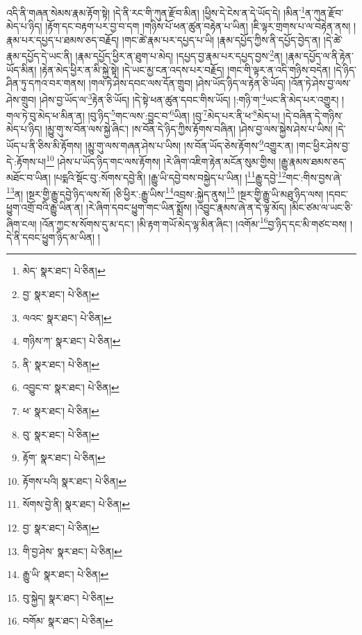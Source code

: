 འདི་ནི་གཞན་སེམས་རྣམ་རྟོག་སྟེ། །དེ་ནི་རང་གི་ཀུན་རྫོབ་མིན། །ཕྱིས་དེ་ངེས་ན་དེ་ཡོད་དེ། །མིན་\footnote{མེད་  སྣར་ཐང་།  པེ་ཅིན། }ན་ཀུན་རྫོབ་མེད་པ་ཉིད། །རྟོག་དང་བརྟག་པར་བྱ་བ་དག །གཉིས་པོ་ཕན་ཚུན་བརྟེན་པ་ཡིན། །ཇི་ལྟར་གྲགས་པ་ལ་བརྟེན་ནས། །རྣམ་པར་དཔྱད་པ་ཐམས་ཅད་བརྗོད། །གང་ཚེ་རྣམ་པར་དཔྱད་པ་ཡི། །རྣམ་དཔྱོད་ཀྱིས་ནི་དཔྱོད་བྱེད་ན། །དེ་ཚེ་རྣམ་དཔྱོད་དེ་ཡང་ནི། །རྣམ་དཔྱོད་ཕྱིར་ན་ཐུག་པ་མེད། །དཔྱད་བྱ་རྣམ་པར་དཔྱད་བྱས་\footnote{བྱ་  སྣར་ཐང་།  པེ་ཅིན། }ན། །རྣམ་དཔྱོད་ལ་ནི་རྟེན་ཡོད་མིན། །རྟེན་མེད་ཕྱིར་ན་མི་སྐྱེ་སྟེ། །དེ་ཡང་མྱ་ངན་འདས་པར་བརྗོད། །གང་གི་ལྟར་ན་འདི་གཉིས་བདེན། །དེ་ཉིད་ཤིན་ཏུ་དཀའ་བར་གནས། །གལ་ཏེ་ཤེས་དབང་ལས་དོན་གྲུབ། །ཤེས་ཡོད་ཉིད་ལ་རྟེན་ཅི་ཡོད། །འོན་ཏེ་ཤེས་བྱ་ལས་ཤེས་གྲུབ། །ཤེས་བྱ་ཡོད་ལ་\footnote{ལའང་  སྣར་ཐང་།  པེ་ཅིན། }རྟེན་ཅི་ཡོད། །དེ་སྟེ་ཕན་ཚུན་དབང་གིས་ཡོད། །:གཉི་ག་\footnote{གཉིས་ཀ་  སྣར་ཐང་།  པེ་ཅིན། }ཡང་ནི་མེད་པར་འགྱུར། །གལ་ཏེ་བུ་མེད་ཕ་མིན་ན། །བུ་ཉིད་\footnote{ནི་  སྣར་ཐང་།  པེ་ཅིན། }གང་ལས་:བྱུང་བ་\footnote{འབྱུང་བ་  སྣར་ཐང་།  པེ་ཅིན། }ཡིན། །བུ་\footnote{ཕ་  སྣར་ཐང་།  པེ་ཅིན། }མེད་པར་ནི་ཕ་\footnote{བུ་  སྣར་ཐང་།  པེ་ཅིན། }མེད་པ། །དེ་བཞིན་དེ་གཉིས་མེད་པ་ཉིད། །མྱུ་གུ་ས་བོན་ལས་སྐྱེ་ཞིང་། །ས་བོན་དེ་ཉིད་ཀྱིས་རྟོགས་བཞིན། །ཤེས་བྱ་ལས་སྐྱེས་ཤེས་པ་ཡིས། །དེ་ཡོད་པ་ནི་ཅིས་མི་རྟོགས། །མྱུ་གུ་ལས་གཞན་ཤེས་པ་ཡིས། །ས་བོན་ཡོད་ཅེས་རྟོགས་\footnote{རྟོག་  སྣར་ཐང་།  པེ་ཅིན། }འགྱུར་ན། །གང་ཕྱིར་ཤེས་བྱ་དེ་:རྟོགས་པ།\footnote{རྟོགས་པའི།  སྣར་ཐང་།  པེ་ཅིན། } །ཤེས་པ་ཡོད་ཉིད་གང་ལས་རྟོགས། །རེ་ཞིག་འཇིག་རྟེན་མངོན་སུམ་གྱིས། །རྒྱུ་རྣམས་ཐམས་ཅད་མཐོང་བ་ཡིན། །པདྨའི་སྡོང་བུ་:སོགས་དབྱེ་ནི། །རྒྱུ་ཡི་དབྱེ་བས་བསྐྱེད་པ་ཡིན། །\footnote{སོགས་བྱེ་ནི།   སྣར་ཐང་།  པེ་ཅིན། }རྒྱུ་དབྱེ་\footnote{བྱ་  སྣར་ཐང་།  པེ་ཅིན། }གང་:གིས་བྱས་ཞེ་\footnote{གི་བྱ་ཤེས་  སྣར་ཐང་།  པེ་ཅིན། }ན། །སྔར་གྱི་རྒྱུ་དབྱེ་ཉིད་ལས་སོ། །ཅི་ཕྱིར་:རྒྱུ་ཡིས་\footnote{རྒྱུ་ཡི་  སྣར་ཐང་།  པེ་ཅིན། }འབྲས་:སྐྱེད་ནུས།\footnote{བུ་སྐྱེད།  སྣར་ཐང་།  པེ་ཅིན། } །སྔར་གྱི་རྒྱུ་ཡི་མཐུ་ཉིད་ལས། །དབང་ཕྱུག་འགྲོ་བའི་རྒྱུ་ཡིན་ན། །རེ་ཞིག་དབང་ཕྱུག་གང་ཡིན་སྨྲོས། །འབྱུང་རྣམས་ཞེ་ན་དེ་ལྟ་མོད། །མིང་ཙམ་ལ་ཡང་ཅི་ཞིག་ངལ། །འོན་ཀྱང་ས་སོགས་དུ་མ་དང་། །མི་རྟག་གཡོ་མེད་ལྷ་མིན་ཞིང་། །འགོམ་\footnote{བགོམ་  སྣར་ཐང་།  པེ་ཅིན། }བྱ་ཉིད་དང་མི་གཙང་བས། །དེ་ནི་དབང་ཕྱུག་ཉིད་མ་ཡིན། །
